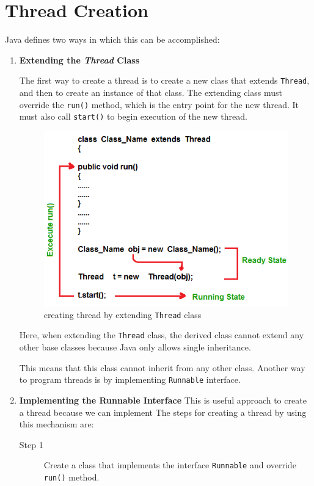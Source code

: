\documentclass[11pt,a4paper]{article}
\begin{document}
\section*{Thread Creation}
Java defines two ways in which this can be accomplished:
\begin{enumerate}
\item \textbf{Extending the \emph{Thread} Class}

The first way to create a thread is to create a new class that extends \texttt{Thread}, and then to create an instance of that class.
The extending class must override the \texttt{run()} method, which is the entry point for the new thread. It must also call \texttt{start()} to begin execution of the new thread.


\begin{figure}[ht]
\begin{center}
\includegraphics[scale=0.6]{Extends-Thread-Class.png}
\caption{creating thread by extending \texttt{Thread} class}
\end{center}
\end{figure}

 


Here, when extending the \texttt{Thread} class, the derived class cannot extend any other base classes because Java only allows single inheritance. 

This means that this class cannot inherit from any other class. Another way to program threads is by implementing \texttt{Runnable} interface.

\item \textbf{Implementing the Runnable Interface}
This is useful approach to create a thread because we can implement
The steps for creating a thread by using this mechanism are:
\begin{description} %
\item[Step 1] Create a class that implements the interface \texttt{Runnable} and override \texttt{run()} method.


\end{description}
\end{enumerate}
\end{document}
